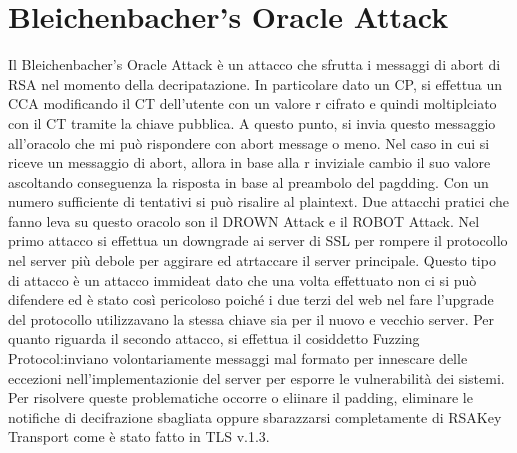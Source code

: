 \documentclass{article}
\begin{document}
\section{Bleichenbacher's Oracle Attack}
Il Bleichenbacher's Oracle Attack è un attacco che sfrutta i messaggi di abort di RSA nel momento della decripatazione\@. In particolare dato un CP, si effettua un CCA modificando il CT dell'utente con un valore r cifrato e quindi moltiplciato con il CT tramite la chiave pubblica\@. A questo punto, si invia questo messaggio all'oracolo che mi può rispondere con abort message o meno\@. Nel caso in cui si riceve un messaggio di abort, allora in base alla r inviziale cambio il suo valore ascoltando conseguenza la risposta in base al preambolo del pagdding\@.\newline
Con un numero sufficiente di tentativi si può risalire al plaintext\@.\newline
Due attacchi pratici che fanno leva su questo oracolo son il DROWN Attack e il ROBOT Attack\@. Nel primo attacco si effettua un downgrade ai server di SSL per rompere il protocollo nel server più debole per aggirare ed atrtaccare il server principale\@. Questo tipo di attacco è un attacco immideat dato che una volta effettuato non ci si può difendere ed è stato così pericoloso poiché i due terzi del web nel fare l'upgrade del protocollo utilizzavano la stessa chiave sia per il nuovo e vecchio server\@.\newline
Per quanto riguarda il secondo attacco, si effettua il cosiddetto Fuzzing Protocol:\@si inviano volontariamente messaggi mal formato per innescare delle eccezioni nell'implementazionie del server per esporre le vulnerabilità dei sistemi\@.\newline
Per risolvere queste problematiche occorre o eliinare il padding, eliminare le notifiche di decifrazione sbagliata oppure sbarazzarsi completamente di RSAKey Transport come è stato fatto in TLS v.1.3\@.
\end{document}

